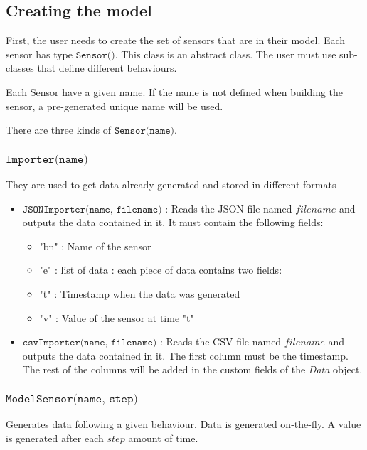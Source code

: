 
\subsection{Creating the model}

First, the user needs to create the set of sensors that are in their model.
Each sensor has type $\texttt{Sensor()}$. This class is an abstract class.
The user must use sub-classes that define different behaviours.

Each Sensor have a given name. If the name is not defined when building the
sensor, a pre-generated unique name will be used.

There are three kinds of $\texttt{Sensor(name)}$.

\subsubsection{$\texttt{Importer(name)}$}
They are used to get data already generated and stored in different formats
\begin{itemize}
    \item $\texttt{JSONImporter(name, filename)}$ : Reads the JSON file named
        $filename$ and outputs the data contained in it. It must contain the
        following fields:
        \begin{itemize}
            \item "bn" : Name of the sensor
            \item "e" : list of data : each piece of data contains two fields:
            \item "t" : Timestamp when the data was generated
            \item "v" : Value of the sensor at time "t"
        \end{itemize}
    \item $\texttt{csvImporter(name, filename)}$ : Reads the CSV file named
        $filename$ and outputs the data contained in it. The first column must
        be the timestamp. The rest of the columns will be added in the custom
        fields of the \emph{Data} object.
\end{itemize}

\subsubsection{$\texttt{ModelSensor(name, step)}$}
Generates data following a given behaviour. Data is generated on-the-fly. A
value is generated after each $step$ amount of time.

